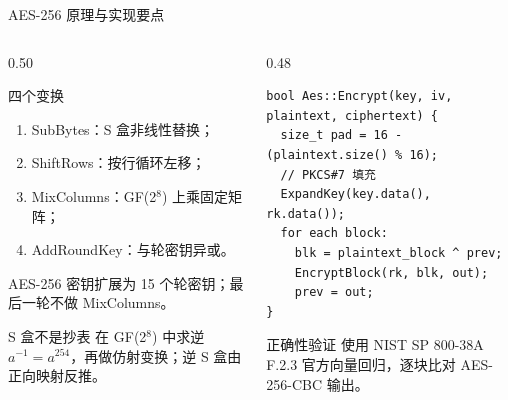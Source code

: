 \documentclass[aspectratio=169,10pt]{beamer}
\begin{document}
\begin{frame}[fragile]{AES-256 原理与实现要点}
  \begin{columns}[T]
    \begin{column}{0.50\textwidth}
      \begin{block}{四个变换}
        \small
        \begin{enumerate}
          \item SubBytes：S 盒非线性替换；
          \item ShiftRows：按行循环左移；
          \item MixColumns：GF(2$^8$) 上乘固定矩阵；
          \item AddRoundKey：与轮密钥异或。
        \end{enumerate}
        AES-256 密钥扩展为 15 个轮密钥；最后一轮不做 MixColumns。
      \end{block}
      \begin{block}{S 盒不是抄表}
        \small
        在 GF(2$^8$) 中求逆 $a^{-1}=a^{254}$，再做仿射变换；逆 S 盒由正向映射反推。
      \end{block}
    \end{column}
    \begin{column}{0.48\textwidth}
      \begin{lstlisting}[style=cppstyle,basicstyle=\ttfamily\tiny]
bool Aes::Encrypt(key, iv, plaintext, ciphertext) {
  size_t pad = 16 - (plaintext.size() % 16);
  // PKCS#7 填充
  ExpandKey(key.data(), rk.data());
  for each block:
    blk = plaintext_block ^ prev;
    EncryptBlock(rk, blk, out);
    prev = out;
}
      \end{lstlisting}
      \begin{block}{正确性验证}
        \small
        使用 NIST SP 800-38A F.2.3 官方向量回归，逐块比对 AES-256-CBC 输出。
      \end{block}
    \end{column}
  \end{columns}
\end{frame}
\end{document}
